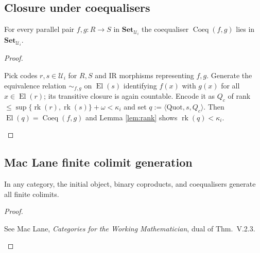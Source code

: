 \documentclass[a4paper,11pt]{article}
\newcommand{\Set}{\mathbf{Set}}
\newcommand{\El}{\operatorname{El}}          %
\newcommand{\rk}{\operatorname{rk}}          %
\newcommand{\Coeq}{\operatorname{Coeq}}
\begin{document}
\subsection{Closure under coequalisers}
\begin{lemma}\label{lem:coeq}
For every parallel pair $f,g\colon R\to S$ in $\Set_{\mathcal U_i}$
the coequaliser $\Coeq(f,g)$ lies in $\Set_{\mathcal U_i}$.
\end{lemma}
\begin{proof}\begin{linenumbers}
Pick codes $r,s\in\mathcal U_i$ for $R,S$ and IR morphisms
representing $f,g$.  Generate the equivalence relation
$\sim_{f,g}$ on $\El(s)$ identifying $f(x)$ with $g(x)$
for all $x\in\El(r)$; its transitive closure is again countable.
Encode it as $Q_c$ of rank
$\le\sup\{\rk(r),\rk(s)\}+\omega<\kappa_i$ and set
\(q:=\langle\mathrm{Quot},s,Q_c\rangle\).
Then $\El(q)=\Coeq(f,g)$ and Lemma \ref{lem:rank} shows
$\rk(q)<\kappa_i$.
\end{linenumbers}\end{proof}



\subsection{Mac Lane finite colimit generation}
\begin{lemma}\label{lem:maclane}
In any category, the initial object, binary coproducts, and coequalisers
generate all finite colimits.
\end{lemma}
\begin{proof}\begin{linenumbers}
See Mac Lane, \emph{Categories for the Working Mathematician},
dual of Thm.~V.2.3.
\end{linenumbers}\end{proof}

\end{document}
